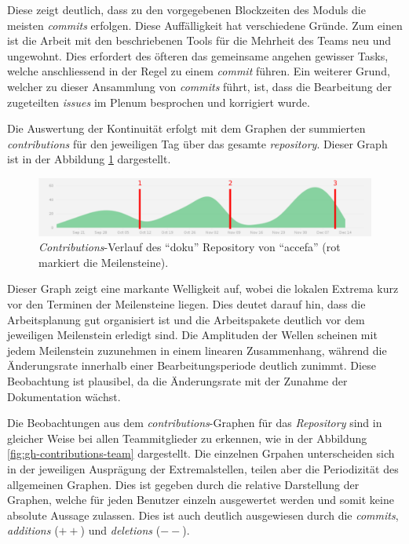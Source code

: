 Diese zeigt deutlich, dass zu den vorgegebenen Blockzeiten des Moduls
die meisten \emph{commits} erfolgen. Diese Auffälligkeit hat verschiedene
Gründe. Zum einen ist die Arbeit mit den beschriebenen Tools für die
Mehrheit des Teams neu und ungewohnt. Dies erfordert des öfteren das
gemeinsame angehen gewisser Tasks, welche anschliessend in der Regel zu
einem \emph{commit} führen. Ein weiterer Grund, welcher zu dieser
Ansammlung von \emph{commits} führt, ist, dass die Bearbeitung der
zugeteilten \emph{issues} im Plenum besprochen und korrigiert wurde.

Die Auswertung der Kontinuität erfolgt mit dem Graphen der summierten
\emph{contributions} für den jeweiligen Tag über das gesamte
\emph{repository}. Dieser Graph ist in der Abbildung 
\ref{fig:gh-contributions-ov} dargestellt.

\begin{figure}[h!]
	\centering
	\includegraphics[width=1\textwidth]{../../fig/pm/gh-contributions-ov_marked.pdf}
	\caption{\emph{Contributions}-Verlauf des ``doku'' Repository
		von ``accefa'' (rot markiert die Meilensteine).}
	\label{fig:gh-contributions-ov}
\end{figure}

Dieser Graph zeigt eine markante Welligkeit auf, wobei die lokalen Extrema
kurz vor den Terminen der Meilensteine liegen. Dies deutet darauf hin, dass
die Arbeitsplanung gut organisiert ist und die Arbeitspakete deutlich vor
dem jeweiligen Meilenstein erledigt sind. Die Amplituden der Wellen
scheinen mit jedem Meilenstein zuzunehmen in einem linearen Zusammenhang,
während die Änderungsrate innerhalb einer Bearbeitungsperiode deutlich zunimmt.
Diese Beobachtung ist plausibel, da die Änderungsrate mit der Zunahme der
Dokumentation wächst.

Die Beobachtungen aus dem \emph{contributions}-Graphen für das
\emph{Repository} sind in gleicher Weise bei allen Teammitglieder zu erkennen,
wie in der Abbildung \ref{fig:gh-contributions-team} dargestellt. Die einzelnen
Grpahen unterscheiden sich in der jeweiligen Ausprägung der Extremalstellen,
teilen aber die Periodizität des allgemeinen Graphen. Dies ist gegeben durch
die relative Darstellung der Graphen, welche für jeden Benutzer einzeln
ausgewertet werden und somit keine absolute Aussage zulassen. Dies ist auch
deutlich ausgewiesen durch die \emph{commits}, \emph{additions} ($++$) und
\emph{deletions} ($--$).

